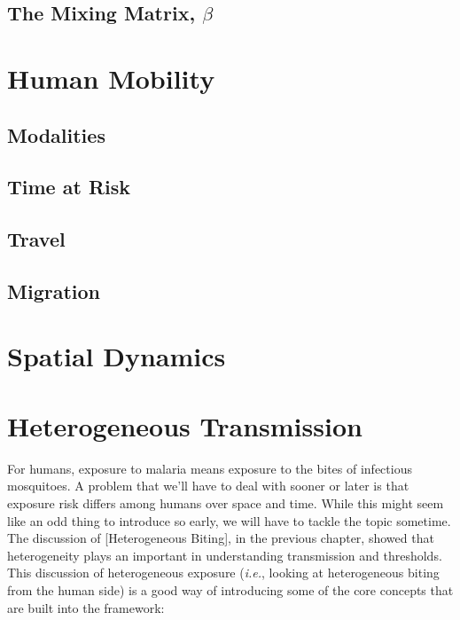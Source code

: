 \documentclass[
]{book}
\begin{document}
\section{\texorpdfstring{The Mixing Matrix, \(\beta\)}{The Mixing Matrix, \textbackslash beta}}\label{the-mixing-matrix-beta}

\chapter{Human Mobility}\label{human-mobility}

\section{Modalities}\label{modalities}

\section{Time at Risk}\label{time-at-risk}

\section{Travel}\label{travel}

\section{Migration}\label{migration}

\chapter{Spatial Dynamics}\label{spatial-dynamics-1}

\chapter{Heterogeneous Transmission}\label{heterogeneous-transmission}

For humans, exposure to malaria means exposure to the bites of infectious mosquitoes. A problem that we'll have to deal with sooner or later is that exposure risk differs among humans over space and time. While this might seem like an odd thing to introduce so early, we will have to tackle the topic sometime. The discussion of {[}Heterogeneous Biting{]}, in the previous chapter, showed that heterogeneity plays an important in understanding transmission and thresholds. This discussion of heterogeneous exposure (\emph{i.e.}, looking at heterogeneous biting from the human side) is a good way of introducing some of the core concepts that are built into the framework:
\end{document}
